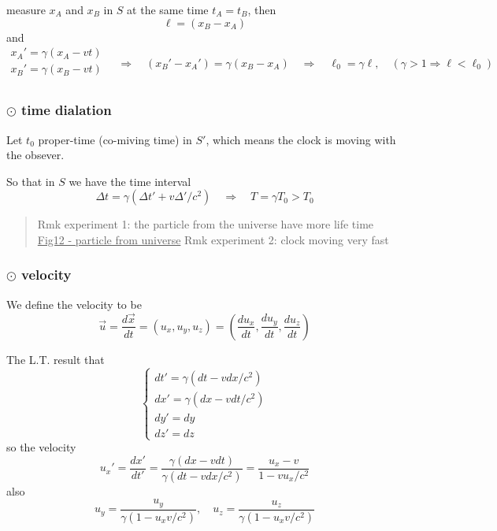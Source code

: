\documentclass[12pt]{article}
\begin{document}
measure $x_A$ and $x_B$ in $S$ at the same time $t_A=t_B$, then
\begin{equation}
\ell = (x_B-x_A)
\end{equation}
and 
\begin{equation}
\begin{aligned}
x_A' = \gamma (x_A - vt)\\
x_B' = \gamma (x_B - vt)\\
\end{aligned}
\quad\Rightarrow\quad
(x_B'-x_A') = \gamma (x_B-x_A)
\quad\Rightarrow\quad
\ell_0 = \gamma \ell,\quad (\gamma>1\Rightarrow \ell<\ell_0)
\end{equation}


\subsubsection{$\odot$ time dialation} %

Let $t_0$ proper-time (co-miving time) in $S'$, which means the clock is moving with the obsever.

So that in $S$ we have the time interval
\begin{equation}
\Delta t = \gamma (\Delta t' + v\Delta '/c^2)
\quad\Rightarrow\quad
T = \gamma T_0 > T_0
\end{equation}


\begin{quote}
	Rmk experiment 1: the particle from the universe have more life time
\underline{Fig12 - particle from universe}
Rmk experiment 2: clock moving very fast
\end{quote}

\subsubsection{$\odot$ velocity} %

We define the velocity to be 
\begin{equation}
\vec{u} = \frac{d\vec{x}}{dt} = \left(u_x,u_y,u_z\right)
= \left(\frac{du_x}{dt},\frac{du_y}{dt},\frac{du_z}{dt}\right)
\end{equation}


The L.T. result that 
\begin{equation}
\begin{cases}
dt' = \gamma (dt - vdx/c^2)\\
dx' = \gamma (dx - vdt/c^2)\\
dy' = dy\\
dz' = dz
\end{cases}
\end{equation}
so the velocity 
\begin{equation}
u_x' = \frac{dx'}{dt'}
= \frac{\gamma (dx-vdt)}{\gamma (dt-vdx/c^2)}
= \frac{u_x-v}{1-vu_x/c^2}
\end{equation}
also 
\begin{equation}
u_y = \frac{u_y}{\gamma (1-u_xv/c^2)}
,\quad
u_z = \frac{u_z}{\gamma (1-u_xv/c^2)}
\end{equation}
\end{document}
